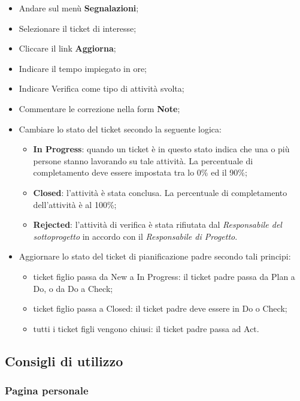 \begin{itemize}
\item Andare sul men\`{u} \textbf{Segnalazioni}; 
\item Selezionare il ticket di interesse; 
\item Cliccare il link \textbf{Aggiorna}; 
\item Indicare il tempo impiegato in ore; 
\item Indicare Verifica come tipo di attivit\`{a} svolta; 
\item Commentare le correzione nella form \textbf{Note}; 
\item Cambiare lo stato del ticket secondo la seguente logica:
		\begin{itemize}
		\item \textbf{In Progress}: quando un ticket \`{e} in questo stato indica che una o pi\`{u} persone 
		stanno lavorando su tale attivit\`{a}. La percentuale di completamento deve 
		essere impostata tra lo 0\% ed il 90\%; 
		\item \textbf{Closed}: l’attivit\`{a} \`{e} stata conclusa. La percentuale di completamento dell’attivit\`{a} \`{e} al 100\%; 
		\item \textbf{Rejected}: l’attivit\`{a} di verifica \`{e} stata rifiutata dal \emph{Responsabile del sottoprogetto} in accordo con il \emph{Responsabile di Progetto}. 
		
		\end{itemize}

\item Aggiornare lo stato del ticket di pianificazione padre secondo tali principi:
		\begin{itemize}
		\item ticket figlio passa da New a In Progress: il ticket padre passa da Plan a Do, 
		o da Do a Check; 
		\item ticket figlio passa a Closed: il ticket padre deve essere in Do o Check; 
		\item tutti i ticket figli vengono chiusi: il ticket padre passa ad Act. 
		
		\end{itemize} 

\end{itemize} 




\subsection{Consigli di utilizzo}
\subsubsection{Pagina personale}
 
